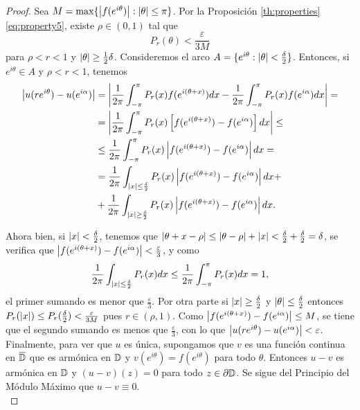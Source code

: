 \begin{proof}
    Sea $M = \max \{ \left\lvert f(e^{i \theta})\right\rvert : \left\lvert\theta\right\rvert \leq \pi \}$. Por la Proposición \ref{th:properties} \eqref{eq:property5}, existe $\rho \in (0,1)$ tal que
    \begin{equation*}
        P_r(\theta) < \frac{\varepsilon}{3 M}
    \end{equation*}
    para $\rho < r < 1$ y $\left\lvert\theta\right\rvert \geq \frac{1}{2} \delta$. Consideremos el arco $A = \{ e^{i \theta} : \left\lvert\theta\right\rvert < \frac{\delta}{2}\}$. Entonces, si $e^{i \theta} \in A$ y $\rho < r < 1$, tenemos
    \begin{equation*}
        \begin{split}
            \left\lvert u(re^{i \theta}) - u(e^{i \alpha})\right\rvert
            & = \left\lvert \dfrac{1}{2 \pi} \int_{- \pi}^{\pi} P_r (x) f(e^{i (\theta + x)}) dx -  \dfrac{1}{2 \pi} \int_{- \pi}^{\pi} P_r (x) f(e^{i \alpha}) dx \right\rvert = \\
            & = \left\lvert \dfrac{1}{2 \pi} \int_{- \pi}^{\pi} P_r (x) \left[f(e^{i (\theta + x)}) - f(e^{i \alpha}) \right] dx\right\rvert \leq \\
            & \leq \dfrac{1}{2 \pi} \int_{- \pi}^{\pi} P_r (x) \left\lvert f(e^{i (\theta + x)}) - f(e^{i \alpha})\right\rvert dx = \\
            & = \dfrac{1}{2 \pi} \int_{\left\lvert x\right\rvert \leq \frac{\delta}{2}} P_r (x) \left\lvert f(e^{i (\theta + x)}) - f(e^{i \alpha})\right\rvert dx + \\
            & + \dfrac{1}{2 \pi} \int_{\left\lvert x\right\rvert \geq \frac{\delta}{2}} P_r (x) \left\lvert f(e^{i (\theta + x)}) - f(e^{i \alpha})\right\rvert dx.
        \end{split}
    \end{equation*}

    Ahora bien, si $\left\lvert x\right\rvert < \frac{\delta}{2}$, tenemos que $\left\lvert\theta + x - \rho\right\rvert \leq \left\lvert\theta - \rho\right\rvert + \left\lvert x\right\rvert < \frac{\delta}{2} + \frac{\delta}{2} = \delta$, se verifica que $\left\lvert f(e^{i (\theta + x)}) - f(e^{i \alpha})\right\rvert < \frac{\varepsilon}{3}$, y como
    \begin{equation*}
        \dfrac{1}{2 \pi} \int_{\left\lvert x\right\rvert \leq \frac{\delta}{2}} P_r (x) dx \leq \dfrac{1}{2 \pi} \int_{-\pi}^{\pi} P_r (x) dx = 1,
    \end{equation*}
    el primer sumando es menor que $\frac{\varepsilon}{3}$. Por otra parte si $\left\lvert x\right\rvert \geq \frac{\delta}{2}$ y $\left\lvert\theta\right\rvert \leq \frac{\delta}{2}$ entonces $P_r(\left\lvert x\right\rvert) \leq P_r(\frac{\delta}{2}) < \frac{\varepsilon}{3M}$ pues $r \in (\rho, 1).$ Como $\left\lvert f(e^{i (\theta + x)}) - f(e^{i \alpha})\right\rvert \leq M$, se tiene que el segundo sumando es menos que $\frac{\varepsilon}{3}$, con lo que $\left\lvert u(re^{i \theta}) - u(e^{i \alpha})\right\rvert < \varepsilon$. \\

    Finalmente, para ver que $u$ es única, supongamos que $v$ es una función continua en $\overline{\mathbb{D}}$ que es armónica en $\mathbb{D}$ y $v(e^{i \theta}) = f(e^{i \theta})$ para todo $\theta$. Entonces $u - v$ es armónica en $\mathbb{D}$ y $(u - v)(z) = 0$ para todo $z \in \partial \mathbb{D}$. Se sigue del Principio del Módulo Máximo que $u - v \equiv 0$. \\
\end{proof}

